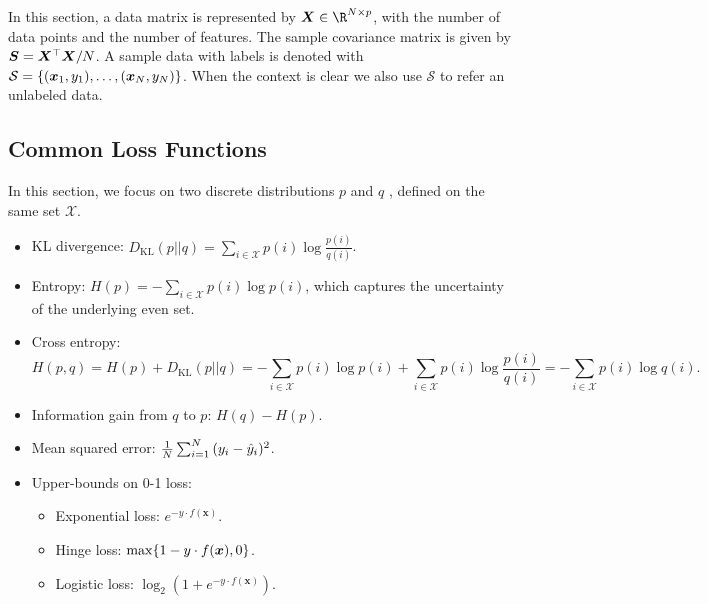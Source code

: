 

In this section, a data matrix is represented by $\bm{X} \in \R^{\ndata \times \nfeat}$, with \ndata the number of data points and \nfeat the number of features. 
The sample covariance matrix is given by $\bm{S} = \bm{X}^\top \bm{X} / N$.
A sample data with labels is denoted with $\mathcal{S}=\{ (\bm{x}_1, y_1), \ldots, (\bm{x}_N, y_N) \}$.
When the context is clear we also use $\mathcal{S}$ to refer an unlabeled data. 

\subsection{Common Loss Functions}
In this section, we focus on two discrete distributions $p$ and $q$ , defined on the same set $\mathcal{X}$.
    \begin{itemize}
        \item KL divergence: $D_\text{KL}(p || q) = \sum_{i \in \mathcal{X}}^{}{p(i) \log \frac{p(i)}{q(i)}}$.
        \item Entropy:  $H(p) = -\sum_{i \in \mathcal{X}}^{}{p(i) \log p(i)}$, which captures the uncertainty of the underlying even set.
        \item Cross entropy: 
            \begin{equation*}
               H(p, q) = H(p) + D_\text{KL}(p || q) =  -\sum_{i \in \mathcal{X}}^{}{p(i) \log p(i)} + \sum_{i \in \mathcal{X}}^{}{p(i) \log \frac{p(i)}{q(i)}} =  -\sum_{i \in \mathcal{X}}^{}{p(i) \log q(i)}.
            \end{equation*}
        \item Information gain from $q$ to $p$: $H(q) - H(p)$. 
        \item Mean squared error: $\frac{1}{N}\sum_{i=1}^{N}{(y_i - \hat{y}_i)^2}$.
        \item Upper-bounds on 0-1 loss:
            \begin{itemize}
                \item Exponential loss: $e^{-y \cdot f(\bm{x})}$.
                \item Hinge loss: $\max\{ 1 - y \cdot f(\bm{x}), 0 \}$.
                \item Logistic loss: $\log_2\left( 1 + e^{-y \cdot f(\bm{x})}\right)$. 
            \end{itemize}
    \end{itemize}
    


